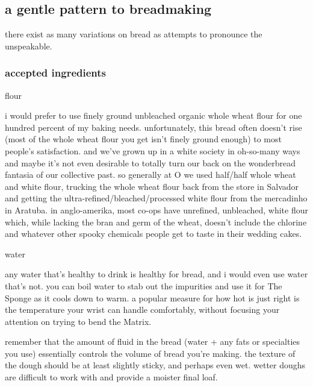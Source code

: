 \subsection{a gentle pattern to breadmaking}
	
there exist as many variations on bread as attempts to pronounce the
unspeakable.

\subsubsection{accepted ingredients}

\begin{ingredients}\item flour\end{ingredients}

i would prefer to use finely ground unbleached organic whole wheat
flour for one hundred percent of my baking needs. unfortunately, this
bread often doesn't rise (most of the whole wheat flour you get
isn't finely ground enough) to most people's satisfaction. and
we've grown up in a white society in oh-so-many ways and maybe
it's not even desirable to totally turn our back on the wonderbread
fantasia of our collective past. so generally at O  we used
half/half whole wheat and white flour, trucking the whole wheat flour
back from the store in Salvador and getting the
ultra-refined/bleached/processed white flour from the 
\gls{mercadinho} in
Aratuba. in anglo-amerika, most co-ops have unrefined, unbleached,
white flour which, while lacking the bran and germ of the wheat,
doesn't include the chlorine and whatever other spooky chemicals
people get to taste in their wedding cakes.

\begin{ingredients}\item water\end{ingredients}

any water that's healthy to drink is healthy for bread, and i would
even use water that's not. you can boil water to stab out the
impurities and use it for The Sponge as it cools down to warm. a
popular measure for how hot is just right is the temperature your
wrist can handle comfortably, without focusing your attention on
trying to bend the Matrix.
	
remember that the amount of fluid in the bread (water + any fats or
specialties you use) essentially controls the volume of bread
you're making. the texture of the dough should be at least slightly
sticky, and perhaps even wet. wetter doughs are difficult to work with
and provide a moister final loaf.

